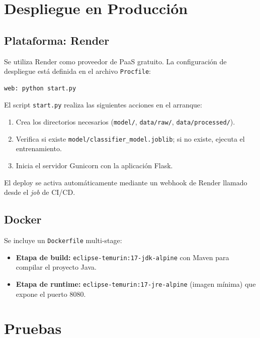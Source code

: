 \documentclass[12pt,a4paper]{article}
\begin{document}
\section{Despliegue en Producción}

\subsection{Plataforma: Render}

Se utiliza Render como proveedor de PaaS gratuito. La configuración de despliegue está definida en el archivo \texttt{Procfile}:

\begin{lstlisting}[style=yaml]
web: python start.py
\end{lstlisting}

El script \texttt{start.py} realiza las siguientes acciones en el arranque:
\begin{enumerate}
  \item Crea los directorios necesarios (\texttt{model/}, \texttt{data/raw/}, \texttt{data/processed/}).
  \item Verifica si existe \texttt{model/classifier\_model.joblib}; si no existe, ejecuta el entrenamiento.
  \item Inicia el servidor Gunicorn con la aplicación Flask.
\end{enumerate}

El deploy se activa automáticamente mediante un webhook de Render llamado desde el \textit{job} de CI/CD.

\subsection{Docker}

Se incluye un \texttt{Dockerfile} multi-stage:
\begin{itemize}
  \item \textbf{Etapa de build:} \texttt{eclipse-temurin:17-jdk-alpine} con Maven para compilar el proyecto Java.
  \item \textbf{Etapa de runtime:} \texttt{eclipse-temurin:17-jre-alpine} (imagen mínima) que expone el puerto 8080.
\end{itemize}

\section{Pruebas}
\end{document}
